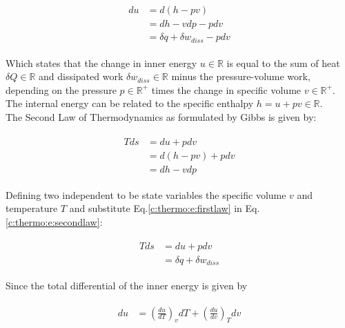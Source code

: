 \begin{align}
\begin{split}
du &= d \left( h - pv \right ) \\ &= dh - v dp - p dv \\
&= \delta q + \delta w_{diss} - p dv
\end{split}
\label{c:thermo:e:firstlaw}
\end{align}

Which states that the change in inner energy $u \in \mathbb{R}$ is equal to the sum of heat $\delta Q \in \mathbb{R}$ and dissipated work $\delta w_{diss} \in \mathbb{R}$ minus the pressure-volume work, depending on the pressure $p \in \mathbb{R}^+$ times the change in specific volume $v \in \mathbb{R}^+$. The internal energy can be related to the specific enthalpy $h = u +pv \in \mathbb{R}$.\\

The Second Law of Thermodynamics as formulated by Gibbs \cite[p.59]{Struchtrup2014ThermodynamicsConversion} is given by:

\begin{align}
\begin{split}
T ds &= du + p dv \\
 &= d( h - pv ) + p dv \\
 &= dh - vdp
\end{split}
\label{c:thermo:e:secondlaw}
\end{align}

Defining two independent to be state variables the specific volume $v$ and temperature $T$ and substitute Eq.\ref{c:thermo:e:firstlaw} in Eq.\ref{c:thermo:e:secondlaw}:

\begin{align}
\begin{split}
T ds &= du + p dv \\
&= \delta q  + \delta w_{diss}
\end{split}
\label{c:thermo:e:firstandsecondlaw}
\end{align}

Since the total differential of the inner energy is given by


\begin{align}
\begin{split}
du &= \left( \frac{du}{dT} \right)_v dT  + \left( \frac{du}{dv} \right)_T dv
\end{split}
\label{c:thermo:e:innerenergydiff}
\end{align}

